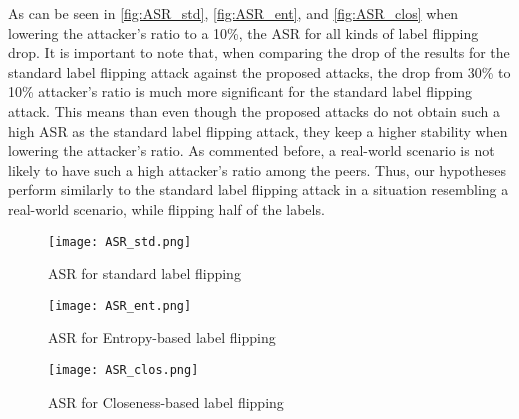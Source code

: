 As can be seen in \autoref{fig:ASR_std}, \autoref{fig:ASR_ent}, and \autoref{fig:ASR_clos} when lowering the attacker's ratio to a 10\%, the ASR for all kinds of label flipping drop. It is important to note that, when comparing the drop of the results for the standard label flipping attack against the proposed attacks, the drop from 30\% to 10\% attacker's ratio is much more significant for the standard label flipping attack. This means than even though the proposed attacks do not obtain such a high ASR as the standard label flipping attack, they keep a higher stability when lowering the attacker's ratio. As commented before, a real-world scenario is not likely to have such a high attacker's ratio among the peers. Thus, our hypotheses perform similarly to the standard label flipping attack in a situation resembling a real-world scenario, while flipping half of the labels.

\begin{figure}[h!]
    \centering
    \texttt{[image: ASR\_std.png]}
    \caption{ASR for standard label flipping}
    \label{fig:ASR_std}
\end{figure}

\begin{figure}[h!]
    \centering
    \texttt{[image: ASR\_ent.png]}
    \caption{ASR for Entropy-based label flipping}
    \label{fig:ASR_ent}
\end{figure}

\begin{figure}[h!]
    \centering
    \texttt{[image: ASR\_clos.png]}
    \caption{ASR for Closeness-based label flipping}
    \label{fig:ASR_clos}
\end{figure}
 
\pagebreak

